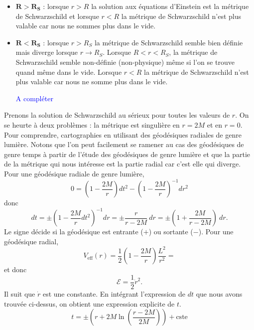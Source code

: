 \documentclass[a4paper,11pt]{report}
\theoremstyle{definition}
\theoremstyle{plain}
\theoremstyle{definition}
\theoremstyle{remark}
\newcommand{\comp}{\begin{center}\textcolor{blue}{A compléter}\end{center}}
\begin{document}
            \begin{itemize}[label = \textbullet]
                \item $\boldsymbol{R>R_S}$ : lorsque $r>R$ la solution aux équations d'Einstein est la métrique de Schwarzschild et lorsque $r<R$ la métrique de Schwarzschild n'est plus valable car nous ne sommes plus dans le vide.
                \item $\boldsymbol{R<R_S}$ : lorsque $r>R_S$ la métrique de Schwarzschild semble bien définie mais diverge lorsque $r\to R_S$. Lorsque $R<r<R_S$, la métrique de Schwarzschild semble non-définie (non-physique) même si l'on se trouve quand même dans le vide. Lorsque $r<R$ la métrique de Schwarzschild n'est plus valable car nous ne somme plus dans le vide.
                \comp
            \end{itemize}
            
            Prenons la solution de Schwarzschild au sérieux pour toutes les valeurs de $r$. On se heurte à deux problèmes : la métrique est singulière en $r=2M$ et en $r=0$. Pour comprendre, cartographies en utilisant des géodésiques radiales de genre lumière. Notons que l'on peut facilement se ramener au cas des géodésiques de genre temps à partir de l'étude des géodésiques de genre lumière et que la partie de la métrique qui nous intéresse est la partie radial car c'est elle qui diverge. Pour une géodésique radiale de genre lumière,
            \begin{equation}
                0 = \left( 1-\frac{2M}{r} \right)dt^2 - \left( 1-\frac{2M}{r} \right)^{-1}dr^2
            \end{equation}
            donc
            \begin{equation}
                 dt = \pm \left( 1-\frac{2M}{r}dt^2 \right)^{-1} dr = \pm \frac{r}{r-2M}~dr = \pm\left( 1+\frac{2M}{r-2M} \right)~dr.
            \end{equation}
            Le signe décide si la géodésique est entrante ($+$) ou sortante ($-$). Pour une géodésique radial, 
            \begin{equation}
                V_{\text{eff}}(r) = \frac{1}{2}\left( 1-\frac{2M}{r} \right)\frac{L^2}{r^2} = 
            \end{equation}
            et donc
            \begin{equation}
                \mathscr{E} = \frac{1}{2}\dot{r}^2.
            \end{equation}
            Il suit que $\dot{r}$ est une constante. En intégrant l'expression de $dt$ que nous avons trouvée ci-dessus, on obtient une expression explicite de $t$.
            \begin{equation}
                t = \pm\left( r+2M\ln\left( \frac{r-2M}{2M} \right) \right) +  \text{cste}
            \end{equation}
             
\end{document}
